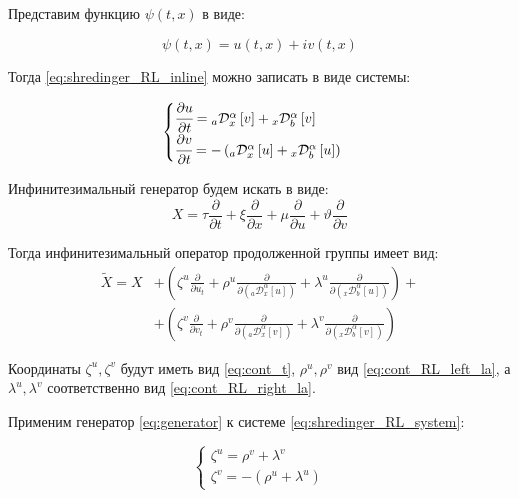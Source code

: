 \documentclass[a4paper, fontsize=14pt]{article}
\newcommand{\RLD}[3]{{}_{#1}\mathcal{D}_{#2}^{\alpha} \left[#3\right]} %
\begin{document}
Представим функцию $\psi(t, x)$ в виде:

\begin{equation*}
  \psi(t, x) = u(t, x) + i v(t, x)
\end{equation*}

Тогда \eqref{eq:shredinger_RL_inline} можно записать в виде системы:

\begin{equation}
  \label{eq:shredinger_RL_system}
  \begin{cases}
    \cfrac{\partial u}{\partial t} = \RLD{a}{x}{v} + \RLD{x}{b}{v} \\
    \cfrac{\partial v}{\partial t} = - \left( \RLD{a}{x}{u} + \RLD{x}{b}{u} \right)
  \end{cases}
\end{equation}


Инфинитезимальный генератор будем искать в виде:
\begin{equation*}
  X = \tau \frac{\partial}{\partial t}  + \xi \frac{\partial}{\partial x}  + \mu \frac{\partial}{\partial u}  + \vartheta  \frac{\partial}{\partial v}
\end{equation*}

Тогда инфинитезимальный оператор продолженной группы имеет вид:
\begin{equation}
  \label{eq:generator}
  \begin{split}
    \tilde{X} = X &+ \left(\zeta^u \frac{\partial }{\partial u_t} + \rho^u \frac{\partial }{\partial (\RLD{a}{x}{u})} + \lambda^u \frac{\partial }{\partial (\RLD{x}{b}{u})} \right) +\\
    &+\left(\zeta^v \frac{\partial }{\partial v_t}  + \rho^v \frac{\partial }{\partial (\RLD{a}{x}{v})}  + \lambda^v \frac{\partial }{\partial (\RLD{x}{b}{v})} \right)
  \end{split}
\end{equation}

Координаты $\zeta^u, \zeta^v$ будут иметь вид \eqref{eq:cont_t}, $\rho^u, \rho^v$ вид \eqref{eq:cont_RL_left_la}, а $\lambda^u, \lambda^v$ соответственно вид \eqref{eq:cont_RL_right_la}.

Применим генератор \eqref{eq:generator} к системе \eqref{eq:shredinger_RL_system}:

\begin{equation}
  \begin{cases}
    \zeta^u = \rho^v + \lambda^v \\
    \zeta^v = - (\rho^u + \lambda^u)
  \end{cases}
\end{equation}
\end{document}
